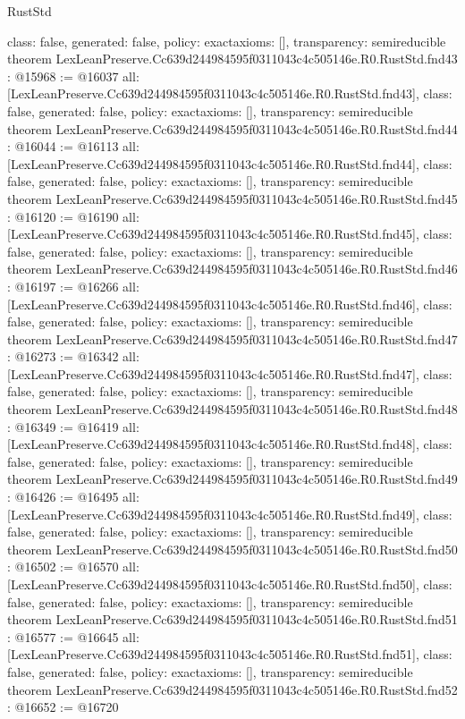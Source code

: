 \begin{lexlean}{RustStd}
\begin{coremodule}
{  class: false,
  generated: false,
  policy: exact{axioms: []},
  transparency: semireducible
}
theorem LexLeanPreserve.Cc639d244984595f0311043c4c505146e.R0.RustStd.fnd43 : @15968 := @16037 {
  all: [LexLeanPreserve.Cc639d244984595f0311043c4c505146e.R0.RustStd.fnd43],
  class: false,
  generated: false,
  policy: exact{axioms: []},
  transparency: semireducible
}
theorem LexLeanPreserve.Cc639d244984595f0311043c4c505146e.R0.RustStd.fnd44 : @16044 := @16113 {
  all: [LexLeanPreserve.Cc639d244984595f0311043c4c505146e.R0.RustStd.fnd44],
  class: false,
  generated: false,
  policy: exact{axioms: []},
  transparency: semireducible
}
theorem LexLeanPreserve.Cc639d244984595f0311043c4c505146e.R0.RustStd.fnd45 : @16120 := @16190 {
  all: [LexLeanPreserve.Cc639d244984595f0311043c4c505146e.R0.RustStd.fnd45],
  class: false,
  generated: false,
  policy: exact{axioms: []},
  transparency: semireducible
}
theorem LexLeanPreserve.Cc639d244984595f0311043c4c505146e.R0.RustStd.fnd46 : @16197 := @16266 {
  all: [LexLeanPreserve.Cc639d244984595f0311043c4c505146e.R0.RustStd.fnd46],
  class: false,
  generated: false,
  policy: exact{axioms: []},
  transparency: semireducible
}
theorem LexLeanPreserve.Cc639d244984595f0311043c4c505146e.R0.RustStd.fnd47 : @16273 := @16342 {
  all: [LexLeanPreserve.Cc639d244984595f0311043c4c505146e.R0.RustStd.fnd47],
  class: false,
  generated: false,
  policy: exact{axioms: []},
  transparency: semireducible
}
theorem LexLeanPreserve.Cc639d244984595f0311043c4c505146e.R0.RustStd.fnd48 : @16349 := @16419 {
  all: [LexLeanPreserve.Cc639d244984595f0311043c4c505146e.R0.RustStd.fnd48],
  class: false,
  generated: false,
  policy: exact{axioms: []},
  transparency: semireducible
}
theorem LexLeanPreserve.Cc639d244984595f0311043c4c505146e.R0.RustStd.fnd49 : @16426 := @16495 {
  all: [LexLeanPreserve.Cc639d244984595f0311043c4c505146e.R0.RustStd.fnd49],
  class: false,
  generated: false,
  policy: exact{axioms: []},
  transparency: semireducible
}
theorem LexLeanPreserve.Cc639d244984595f0311043c4c505146e.R0.RustStd.fnd50 : @16502 := @16570 {
  all: [LexLeanPreserve.Cc639d244984595f0311043c4c505146e.R0.RustStd.fnd50],
  class: false,
  generated: false,
  policy: exact{axioms: []},
  transparency: semireducible
}
theorem LexLeanPreserve.Cc639d244984595f0311043c4c505146e.R0.RustStd.fnd51 : @16577 := @16645 {
  all: [LexLeanPreserve.Cc639d244984595f0311043c4c505146e.R0.RustStd.fnd51],
  class: false,
  generated: false,
  policy: exact{axioms: []},
  transparency: semireducible
}
theorem LexLeanPreserve.Cc639d244984595f0311043c4c505146e.R0.RustStd.fnd52 : @16652 := @16720 {
}
\end{coremodule}
\end{lexlean}
